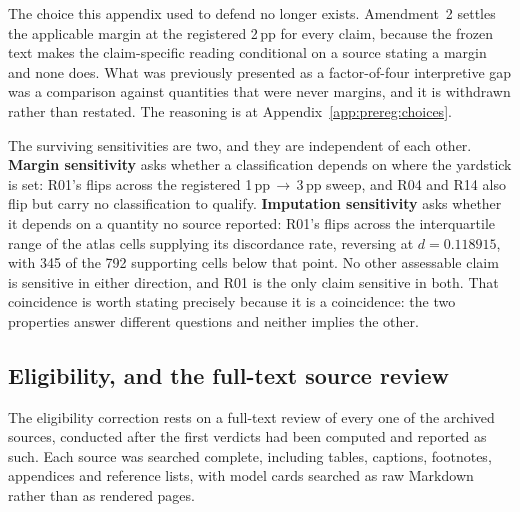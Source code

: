 The choice this appendix used to defend no longer exists. Amendment~2 settles
the applicable margin at the registered 2\,pp for every claim, because the
frozen text makes the claim-specific reading conditional on a source stating a
margin and none does. What was previously presented as a factor-of-four
interpretive gap was a comparison against quantities that were never margins,
and it is withdrawn rather than restated. The reasoning is at
Appendix~\ref{app:prereg:choices}.

The surviving sensitivities are two, and they are independent of each other.
\textbf{Margin sensitivity} asks whether a classification depends on where the
yardstick is set: R01's flips across the registered 1\,pp\,$\to$\,3\,pp sweep,
and R04 and R14 also flip but carry no classification to qualify.
\textbf{Imputation sensitivity} asks whether it depends on a quantity no source
reported: R01's flips across the interquartile range of the atlas cells
supplying its discordance rate, reversing at $d = 0.118915$, with 345 of the 792
supporting cells below that point. No other assessable claim is sensitive in
either direction, and R01 is the only claim sensitive in both. That coincidence
is worth stating precisely because it is a coincidence: the two properties
answer different questions and neither implies the other.

%
%

\subsection{Eligibility, and the full-text source review}
\label{app:audit:eligibility}

The eligibility correction rests on a full-text review of every one of the
\AuditFrozenCandidates{} archived sources, conducted after the first verdicts had
been computed and reported as such. Each source was searched complete, including
tables, captions, footnotes, appendices and reference lists, with model cards
searched as raw Markdown rather than as rendered pages.

